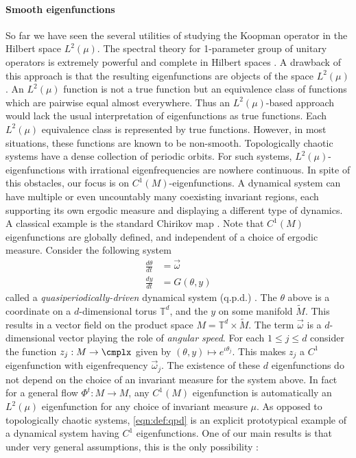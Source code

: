 \documentclass[12pt,oneside]{article}
\begin{document}
\paragraph{Smooth eigenfunctions} So far we have seen the several utilities of studying the Koopman operator in the Hilbert space $L^2(\mu)$. The spectral theory for 1-parameter group of unitary operators is extremely powerful and complete in Hilbert spaces \cite{EisnerEtAl15, DGJ_compactV_2018, ValvaGiannakis2023cnstnt}. A drawback of this approach is that the resulting eigenfunctions are objects of the space $L^2(\mu)$. An $L^2(\mu)$ function is not a true function but an equivalence class of functions which are pairwise equal almost everywhere. Thus an $L^2(\mu)$-based approach would lack the usual interpretation of eigenfunctions as true functions. Each $L^2(\mu)$ equivalence class is represented by true functions. However, in most situations, these functions are known to be non-smooth. Topologically chaotic systems have a dense collection of periodic orbits. For such systems, $L^2(\mu)$-eigenfunctions with irrational eigenfrequencies are nowhere continuous. In spite of this obstacles, our focus is on $C^1(M)$-eigenfunctions. A dynamical system can have multiple or even uncountably many coexisting invariant regions, each supporting its own ergodic measure and displaying a different type of dynamics. A classical example is the standard Chirikov map \cite{Chirikov1971std, Chirikov1979std, DSSY_Mes_QuasiP_2016}. Note that $C^1(M)$ eigenfunctions are globally defined, and independent of a choice of ergodic measure.  Consider the following system
%
\begin{equation} \label{eqn:def:qpd}
	\begin{split}
		\frac{d \theta}{dt} &= \vec{\omega} \\
		\frac{d y}{dt} &= G(\theta, y)
	\end{split}
\end{equation}
%
called a \emph{quasiperiodically-driven} dynamical system (q.p.d.) \cite{DasMustAgar2023_qpd, DasEtAl2023traffic}. The $\theta$ above is a coordinate on a $d$-dimensional torus $\mathbb{T}^d$, and the $y$ on some manifold $\tilde{M}$. This results in a vector field on the product space $M = \mathbb{T}^d \times \tilde{M}$. The term $\vec{\omega}$ is a $d$-dimensional vector playing the role of \emph{angular speed}. For each $1 \leq j \leq d$ consider the function $z_j : M \to \cmplx$ given by $(\theta, y) \mapsto e^{\iota \theta_j}$. This makes $z_j$ a $C^1$ eigenfunction with eigenfrequency $\vec{\omega}_j$. The existence of these $d$ eigenfunctions do not depend on the choice of an invariant measure for the system above. In fact for a general flow $\Phi^t : M \to M$, any $C^1(M)$ eigenfunction is automatically an $L^2(\mu)$ eigenfunction for any choice of invariant measure $\mu$. As opposed to topologically chaotic systems, \eqref{eqn:def:qpd} is an explicit prototypical example of a dynamical system having $C^1$ eigenfunctions. One of our main results is that under very general assumptions, this is the only possibility : 
\end{document}

